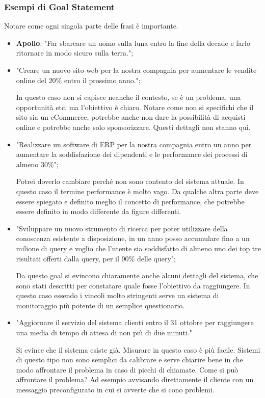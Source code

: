 \subsubsection{Esempi di Goal Statement}
Notare come ogni singola parte delle frasi è importante.
\begin{itemize}
	\item \textbf{Apollo}: "Far sbarcare un uomo sulla luna entro la fine della decade e farlo ritornare in modo sicuro sulla terra.";
	\item "Creare un nuovo sito web per la nostra compagnia per aumentare le vendite online del 20\% entro il prossimo anno.";
	\begin{info}
		In questo caso non si capisce neanche il contesto, se è un problema, una opportunità etc. ma l'obiettivo è chiaro. Notare come non si specifichi che il sito sia un eCommerce, potrebbe anche non dare la possibilità di acquisti online e potrebbe anche solo sponsorizzare. Questi dettagli non stanno qui.
	\end{info}
	\item "Realizzare un software di ERP per la nostra compagnia entro un anno per aumentare la soddisfazione dei dipendenti e le performance dei processi di almeno 30\%";
	\begin{info}
		Potrei doverlo cambiare perché non sono contento del sistema attuale. In questo caso il termine performance è molto vago. Da qualche altra parte deve essere spiegato e definito meglio il concetto di performance, che potrebbe essere definito in modo differente da figure differenti.
	\end{info}
	\item "Sviluppare un nuovo strumento di ricerca per poter utilizzare della conoscenza esistente a disposizione, in un anno posso accumulare fino a un milione di query e voglio che l'utente sia soddisfatto di almeno uno dei top tre risultati offerti dalla query, per il 90\% delle query";
	\begin{info}
		Da questo goal si evincono chiaramente anche alcuni dettagli del sistema, che sono stati descritti per constatare quale fosse l'obiettivo da raggiungere. In questo caso essendo i vincoli molto stringenti serve un sistema di monitoraggio più potente di un semplice questionario.
	\end{info}
	\item "Aggiornare il servizio del sistema clienti entro il 31 ottobre per raggiungere una media di tempo di attesa di non più di due minuti."
		\begin{info}
		Si evince che il sistema esiste già. Misurare in questo caso è più facile. Sistemi di questo tipo non sono semplici da calibrare e serve chiarire bene in che modo affrontare il problema in caso di picchi di chiamate. Come si può affrontare il problema? Ad esempio avvisando direttamente il cliente con un messaggio preconfigurato in cui si avverte che si cono problemi.
	\end{info}
\end{itemize}
